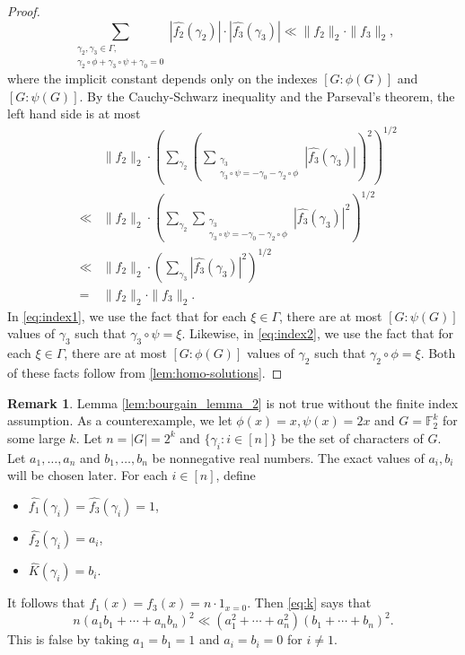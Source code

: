 \documentclass[10pt]{article}
\theoremstyle{definition}
\newtheorem{remark}{Remark}
\newcommand{\F}{\mathbb{F}}
\begin{document}
\begin{proof}
\[
\sum_{\substack{ \gamma_2, \gamma_3 \in \Gamma,\\ \gamma_2 \circ \phi + \gamma_3 \circ \psi + \gamma_0=0}} |\widehat{f_2}(\gamma_2) | \cdot | \widehat{f_3}(\gamma_3) | \ll \|f_2 \|_2 \cdot \| f_3 \|_2,
\]
where the implicit constant depends only on the indexes $[G:\phi(G)]$ and $[G:\psi(G)]$.
By the Cauchy-Schwarz inequality and the Parseval's theorem, the left hand side is at most
\begin{eqnarray}
& & \| f_2 \|_2 \cdot \left( \sum_{\gamma_2} \left( \sum_{\substack{\gamma_3 \\ \gamma_3 \circ \psi = - \gamma_0 - \gamma_2 \circ \phi}} | \widehat{f_3}(\gamma_3) | \right)^2  \right)^{1/2} \nonumber \\
& \ll & \| f_2 \|_2 \cdot \left( \sum_{\gamma_2} \sum_{\substack{\gamma_3 \\ \gamma_3 \circ \psi = - \gamma_0 - \gamma_2 \circ \phi}} | \widehat{f_3}(\gamma_3) |^2  \right)^{1/2} \label{eq:index1} \\
& \ll & \| f_2 \|_2 \cdot \left( \sum_{\gamma_3}  | \widehat{f_3}(\gamma_3) |^2  \right)^{1/2} \label{eq:index2} \\
&=& \| f_2 \|_2 \cdot \| f_3 \|_2. \nonumber
\end{eqnarray}
In \eqref{eq:index1}, we use the fact that for each $\xi \in \Gamma$, there are at most $[G: \psi(G)]$ values of $\gamma_3$ such that $\gamma_3 \circ \psi = \xi$. Likewise, in \eqref{eq:index2}, we use the fact that for each $\xi \in \Gamma$, there are at most $[G: \phi(G)]$ values of $\gamma_2$ such that $\gamma_2 \circ \phi = \xi$. Both of these facts follow from \cref{lem:homo-solutions}.
\end{proof}

\setcounter{remark}{3}
\begin{remark} Lemma \ref{lem:bourgain_lemma_2} is not true without the finite index assumption.
As a counterexample, we let $\phi(x) = x, \psi(x) = 2x$ and $G=\F_2 ^k$ for some large $k$. Let $n=|G| = 2^k$ and $\{\gamma_i: i \in [n]\}$ be the set of characters of $G$. Let $a_1, \ldots, a_n$ and $b_1, \ldots, b_n$ be nonnegative real numbers. The exact values of $a_i, b_i$ will be chosen later. For each $i \in [n]$, define 
\begin{itemize}
\item $\widehat{f_1}(\gamma_i) = \widehat{f_3}(\gamma_i) =1$,
\item $\widehat{f_2}(\gamma_i) = a_i$,
\item $\widehat{K}(\gamma_i) = b_i$.
\end{itemize}
It follows that $f_1(x) = f_3(x) = n \cdot 1_{x=0}$.
Then \eqref{eq:k} says that
\[
n(a_1 b_1 + \cdots + a_n b_n)^2 \ll (a_1^2 + \cdots + a_n^2) (b_1 + \cdots + b_n)^2.
\]
This is false by taking $a_1=b_1=1$ and $a_i = b_i =0$ for $i \neq 1$.
\end{remark}
\end{document}
